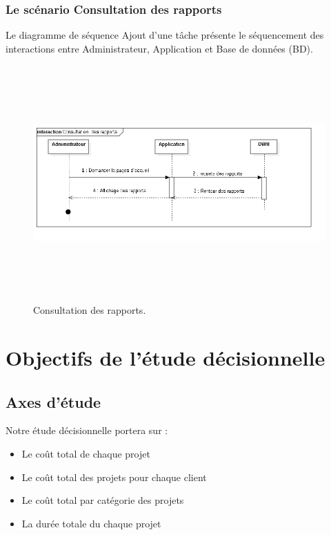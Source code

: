 \subsubsection{Le sc\'{e}nario \guillemotleft{} Consultation des rapports\guillemotright{}}
Le diagramme de s\'{e}quence \guillemotleft{} Ajout d'une t\^{a}che \guillemotright{} pr\'{e}sente le s\'{e}quencement
des interactions entre Administrateur, Application et Base de donn\'{e}es (BD).


\begin{figure}[H]
\center
\includegraphics[width=14cm,height=9cm]{./figures/seq/G.png}
\caption{Consultation des rapports.}
\end{figure}


\section{ Objectifs de l'\'{e}tude d\'{e}cisionnelle }


\subsection{Axes d'\'{e}tude}
Notre \'{e}tude d\'{e}cisionnelle portera sur :

\begin{itemize}
  \item { Le co\^{u}t total de chaque projet}
  \item { Le co\^{u}t total des projets pour chaque client }
  \item { Le co\^{u}t total par cat\'{e}gorie des projets }
  \item { La dur\'{e}e totale du chaque projet }

\end{itemize}

